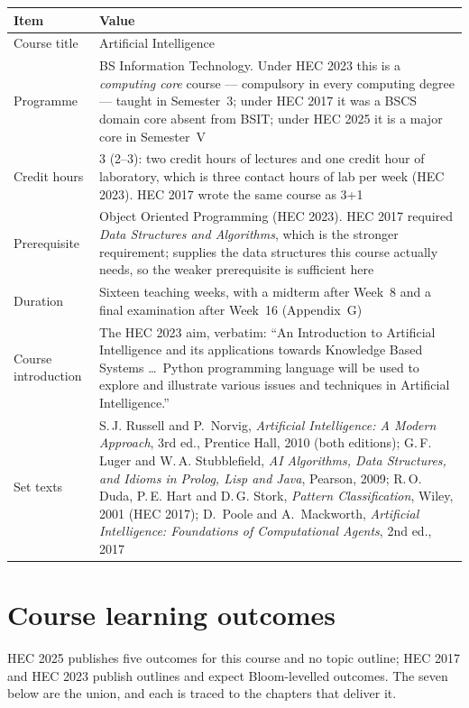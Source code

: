 \begin{longtable}{@{}L{4.2cm}L{11.0cm}@{}}
\toprule
{}
\textbf{Item} & \textbf{Value} \\
\midrule
\endhead
Course title & Artificial Intelligence \\
Programme & BS Information Technology. Under HEC 2023 this is a \emph{computing
core} course --- compulsory in every computing degree --- taught in Semester~3;
under HEC 2017 it was a BSCS domain core absent from BSIT; under HEC 2025 it is a
major core in Semester~V \\
Credit hours & 3 (2--3): two credit hours of lectures and one credit hour of
laboratory, which is three contact hours of lab per week (HEC 2023). HEC 2017
wrote the same course as 3+1 \\
Prerequisite & Object Oriented Programming (HEC 2023). HEC 2017 required
\emph{Data Structures and Algorithms}, which is the stronger requirement;
 supplies the data structures this course actually needs, so the
weaker prerequisite is sufficient here \\
Duration & Sixteen teaching weeks, with a midterm after Week~8 and a final
examination after Week~16 (Appendix~G) \\
Course introduction & The HEC 2023 aim, verbatim: ``An Introduction to Artificial
Intelligence and its applications towards Knowledge Based Systems \ldots\ Python
programming language will be used to explore and illustrate various issues and
techniques in Artificial Intelligence.'' \\
Set texts & S.\,J. Russell and P.\ Norvig, \emph{Artificial Intelligence: A Modern
Approach}, 3rd ed., Prentice Hall, 2010 (both editions); G.\,F. Luger and
W.\,A. Stubblefield, \emph{AI Algorithms, Data Structures, and Idioms in Prolog,
Lisp and Java}, Pearson, 2009; R.\,O. Duda, P.\,E. Hart and D.\,G. Stork,
\emph{Pattern Classification}, Wiley, 2001 (HEC 2017); D.\ Poole and
A.\ Mackworth, \emph{Artificial Intelligence: Foundations of Computational
Agents}, 2nd ed., 2017 \\
\bottomrule
\end{longtable}

\section*{Course learning outcomes}

HEC 2025 publishes five outcomes for this course and no topic outline; HEC 2017
and HEC 2023 publish outlines and expect Bloom-levelled outcomes. The seven below
are the union, and each is traced to the chapters that deliver it.


